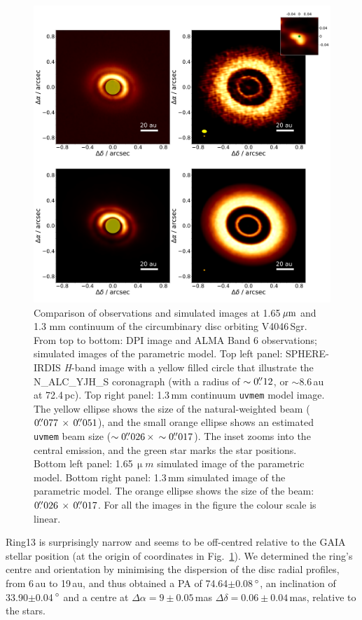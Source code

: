 \documentclass[letters,usenatbib,times]{mnras}
\begin{document}
\begin{figure}
  \includegraphics[width=\textwidth]{hot_two_E.pdf}
  \caption{Comparison of observations and simulated images at 1.65\,$\hbox{$\mu$m}$ and 1.3 mm continuum of the circumbinary disc orbiting V4046\,Sgr. From top to bottom: DPI image and ALMA Band 6 observations; simulated images of the parametric model. Top left panel: SPHERE-IRDIS \textit{H}-band image with a yellow filled circle that illustrate the N\_ALC\_YJH\_S coronagraph (with a radius of $\sim0\hbox{$.\!\!^{\prime\prime}$}12$, or $\sim$8.6\,au at 72.4\,pc). Top right panel: 1.3\,mm continuum {\tt uvmem} model image. The yellow ellipse shows the size of the natural-weighted beam ($ 0\hbox{$.\!\!^{\prime\prime}$}077 \, \times \, 0\hbox{$.\!\!^{\prime\prime}$}051$), and the small orange ellipse shows an estimated {\tt uvmem} beam size ($\sim0\hbox{$.\!\!^{\prime\prime}$}026 \, \times \, \sim0\hbox{$.\!\!^{\prime\prime}$}017$). The inset zooms into the central emission, and the green star marks the star positions. Bottom left panel: 1.65\,$\upmu m$ simulated image of the parametric model. Bottom right panel: 1.3\,mm simulated image of the parametric model. The orange ellipse shows the size of the beam: $0\hbox{$.\!\!^{\prime\prime}$}026 \, \times \, 0\hbox{$.\!\!^{\prime\prime}$}017$. For all the images in the figure the colour scale is linear.}
  \label{fig:images_vs_simulated}
\end{figure}

Ring13 is surprisingly narrow and seems to be off-centred relative to the GAIA stellar position (at the origin of coordinates in Fig.~\ref{fig:images_vs_simulated}). We determined the ring's centre and orientation by minimising the dispersion of the disc radial profiles, from 6\,au to 19\,au, and thus obtained a PA of 74.64$\pm$0.08\,$\hbox{$^\circ$}$, an inclination of 33.90$\pm$0.04\,$\hbox{$^\circ$}$ and a centre at $\Delta \alpha = 9\pm0.05$\,mas $\Delta \delta = 0.06\pm0.04$\,mas, relative to the stars.
\end{document}
